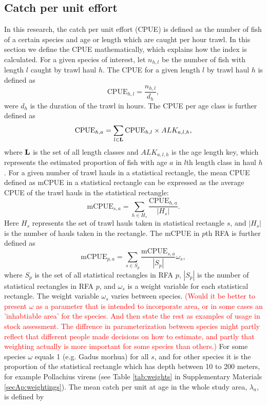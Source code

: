 \documentclass[a4paper 12pt]{article}
\numberwithin{equation}{section}
\newcommand{\ed}[1]{\textcolor{red}{#1}}
\begin{document}
\subsection{Catch per unit effort}
\label{sec:cpueestimators}
In this research, the catch per unit effort (CPUE) is defined as the number of fish of a certain species and age or length which are caught per hour trawl. In this section we define the CPUE mathematically, which explains how the index is calculated. For a given species of interest, let $n_{h,l}$ be the number of fish with length $l$ caught by trawl haul $h$. The CPUE for a given length $l$ by trawl haul $h$ is defined as 
\begin{equation}\label{eq:cpueHaul}
\mathrm{CPUE}_{h,l} =\frac{n_{h,l}}{d_h},
\end{equation}
were $d_h$ is the duration of the trawl in hours. The CPUE per age class is further defined as
\begin{equation}\label{eq:cpueALK}
\mathrm{CPUE}_{h,a} =\sum_{l \in {\bf L}}\mathrm{CPUE}_{h, l} \times ALK_{a,l,h},
\end{equation}
where ${\bf L}$ is the set of all length classes and $ALK_{a,l,h}$ is the age length key, which represents the estimated proportion of fish with age $a$ in $l$th length class in haul $h$. For a given number of trawl hauls in a statistical rectangle, the mean CPUE defined as  mCPUE  in a statistical rectangle can be expressed as the average CPUE of the trawl hauls in the statistical rectangle:
\begin{equation}\label{eq:cpueRec}
\mathrm{mCPUE}_{s,a} =\sum_{h \in H_{s}}\frac{\mathrm{CPUE}_{h,a}}{|H_{s}|}.
\end{equation}
Here $H_{s}$ represents the set of trawl hauls taken in statistical rectangle $s$, and $|H_{s}|$ is the number of hauls taken in the rectangle. The mCPUE in $p$th RFA is further defined as
\begin{equation}\label{eq:cpueRFA}
\mathrm{mCPUE}_{p,a} = \sum_{s \in S_{p}} \frac{\mathrm{mCPUE}_{s,a}}{|S_{p}|} \omega_s,
\end{equation}
where $S_{p}$ is the set of all statistical rectangles in RFA $p$, $|S_{p}|$ is the number of statistical rectangles in RFA $p$, and $\omega_s$ is a weight variable for each statistical rectangle. The weight variable $\omega_s$ varies between species. \ed{(Would it be better to present $\omega$ as a parameter that is intended to incorporate area, or in some cases an 'inhabtiable area' for the species. And then state the rest as examples of usage in stock assessment. The diffrence in parameterization between species might partly reflect that different people made decisions on how to estimate, and partly that weighting actually is more important for some species than others.)} For some species $\omega$ equals 1 (e.g. Gadus morhua) for all $s$, and for other species it is the proportion of the statistical rectangle which has depth between 10 to 200 meters, for example Pollachius virens (see Table \ref{tab:weights} in Supplementary Materials \ref{secAp:weightings}).  The mean catch per unit at age in the whole study area, $\lambda_{a}$, is defined by
\end{document}
